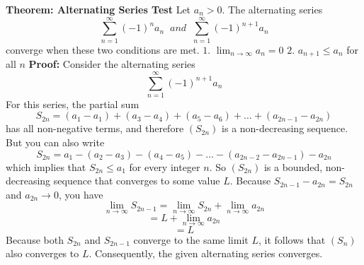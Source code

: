 \nopagenumbers
{\bf Theorem: Alternating Series Test}
\vskip 6pt
Let $a_n>0$. The alternating series $$\sum_{n=1}^\infty(-1)^na_n \;\; and \;\; \sum_{n=1}^\infty(-1)^{n+1}a_n$$ converge when these two conditions are met.
\vskip 1mm
$1.$ $\lim_{n\to\infty} a_n=0$ 
\vskip 1mm
$2.$ $a_{n+1} \leq a_n$ for all $n$
\vskip 10pt
{\bf Proof:}
\vskip 6pt
Consider the alternating series $$\sum_{n=1}^\infty(-1)^{n+1}a_n$$ For this series, the partial sum $$S_{2n}=(a_1-a_1)+(a_3-a_4)+(a_5-a_6)+\ldots+(a_{2n-1}-a_{2n})$$ has all non-negative terms, and therefore $(S_{2n})$ is a non-decreasing sequence. But you can also write $$S_{2n}=a_1-(a_2-a_3)-(a_4-a_5)-\ldots-(a_{2n-2}-a_{2n-1})-a_{2n}$$ which implies that $S_{2n} \leq a_1$ for every integer $n$. So $(S_{2n})$ is a bounded, non-decreasing sequence that converges to some value $L$. Because $S_{2n-1}-a_{2n}=S_{2n}$ and $a_{2n}\to 0$, you have $$\lim_{n\to\infty} S_{2n-1}=\lim_{n\to\infty}S_{2n}+\lim_{n\to\infty}a_{2n}$$ $$=L+\lim_{n\to\infty}a_{2n}$$ $$=L$$ Because both $S_{2n}$ and $S_{2n-1}$ converge to the same limit $L$, it follows that $(S_n)$ also converges to $L$. Consequently, the given alternating series converges.


\vfill\eject
